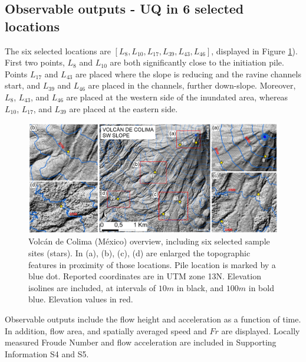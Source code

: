 \documentclass{article}
\begin{document}
\subsection{Observable outputs - UQ in 6 selected locations}\label{Obs2}
The six selected locations are $[L_8, L_{10}, L_{17}, L_{39}, L_{43}, L_{46}]$, displayed in Figure \ref{fig:Colima-extra}). First two points, $L_8$ and $L_{10}$ are both significantly close to the initiation pile. Points $L_{17}$ and $L_{43}$ are placed where the slope is reducing and the ravine channels start, and $L_{39}$ and $L_{46}$ are placed in the channels, further down-slope. Moreover, $L_8$, $L_{43}$, and $L_{46}$ are placed at the western side of the inundated area, whereas $L_{10}$, $L_{17}$, and $L_{39}$ are placed at the eastern side.
\begin{figure}[H]
         \centering
        \includegraphics[width=1\textwidth]{BAF_VolcanDeColima/FigExtra.jpg}
        \caption{Volc{\'a}n de Colima (M{\'e}xico) overview, including six selected sample sites (stars). In (a), (b), (c), (d) are enlarged the topographic features in proximity of those locations. Pile location is marked by a blue dot. Reported coordinates are in UTM zone 13N. Elevation isolines are included, at intervals of $10 m$ in black, and $100m$ in bold blue. Elevation values in red.}
        \label{fig:Colima-extra}
\end{figure}
Observable outputs include the flow height and acceleration as a function of time. In addition, flow area, and spatially averaged speed and $Fr$ are displayed. Locally measured Froude Number and flow acceleration are included in Supporting Information S4 and S5.
\end{document}
